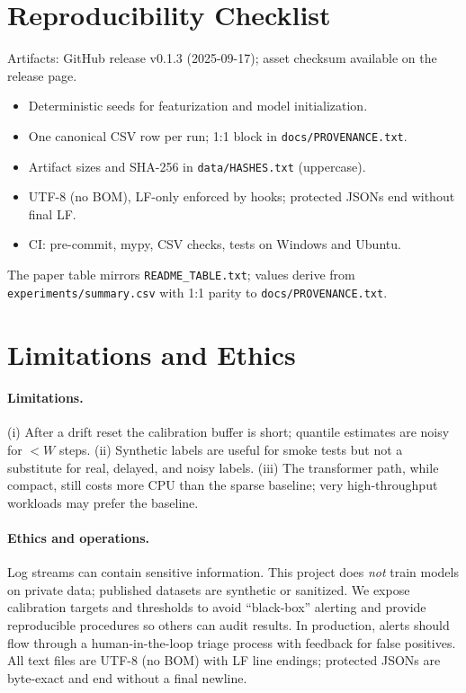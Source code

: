 \documentclass[10pt,twocolumn]{article}
\begin{document}
\section{Reproducibility Checklist}
Artifacts: GitHub release v0.1.3 (2025-09-17); asset checksum available on the release page.
\begin{itemize}[leftmargin=*]
  \item Deterministic seeds for featurization and model initialization.
  \item One canonical CSV row per run; 1:1 block in \texttt{docs/PROVENANCE.txt}.
  \item Artifact sizes and SHA-256 in \texttt{data/HASHES.txt} (uppercase).
  \item UTF-8 (no BOM), LF-only enforced by hooks; protected JSONs end without final LF.
  \item CI: pre-commit, mypy, CSV checks, tests on Windows and Ubuntu.
\end{itemize}
The paper table mirrors \texttt{README\_TABLE.txt}; values derive from \texttt{experiments/summary.csv} with 1:1 parity to \texttt{docs/PROVENANCE.txt}.
\section{Limitations and Ethics}
\paragraph{Limitations.} (i) After a drift reset the calibration buffer is short; quantile estimates are noisy for $<\!W$ steps. (ii) Synthetic labels are useful for smoke tests but not a substitute for real, delayed, and noisy labels. (iii) The transformer path, while compact, still costs more CPU than the sparse baseline; very high-throughput workloads may prefer the baseline.
\paragraph{Ethics and operations.} Log streams can contain sensitive information. This project does \emph{not} train models on private data; published datasets are synthetic or sanitized. We expose calibration targets and thresholds to avoid ``black-box'' alerting and provide reproducible procedures so others can audit results. In production, alerts should flow through a human-in-the-loop triage process with feedback for false positives.
All text files are UTF-8 (no BOM) with LF line endings; protected JSONs are byte-exact and end without a final newline.
\end{document}
